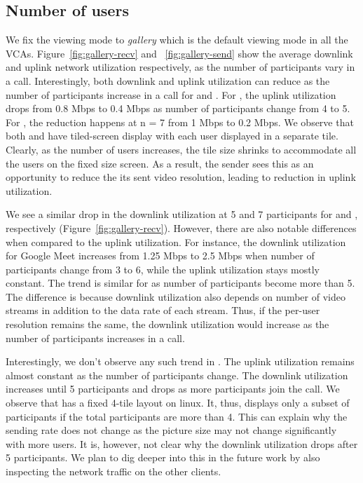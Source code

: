 \subsection{Number of users}
We fix the viewing mode to \textit{gallery} which is the default viewing mode in all the VCAs. Figure~\ref{fig:gallery-recv} and~
\ref{fig:gallery-send} show the average downlink and uplink network utilization respectively, as the number of participants vary in a call. Interestingly, both downlink and uplink utilization can reduce as the number of participants increase in a call for \meet and \zoom. For \zoom, the uplink utilization drops from 0.8 Mbps to 0.4 Mbps as number of participants change from 4 to 5. For \meet, the reduction happens at n = 7 from 1 Mbps to  0.2 Mbps. We observe that both \meet and \zoom have tiled-screen display with each user displayed in a separate tile. Clearly, as the number of users increases, the tile size shrinks to accommodate all the users on the fixed size screen. As a result, the sender sees this as an opportunity to reduce the its sent video resolution, leading to reduction in uplink utilization.


We see a similar drop in the downlink utilization at 5 and 7 participants for \zoom and \meet, respectively (Figure~\ref{fig:gallery-recv}). However, there are also notable differences when compared to the uplink utilization. For instance, the downlink utilization for Google Meet increases from 1.25 Mbps to 2.5 Mbps when number of participants change from 3 to 6, while the uplink utilization stays mostly constant. The trend is similar for \zoom as number of participants become more than 5. The difference is because downlink utilization also depends on number of video streams in addition to the data rate of each stream. Thus, if the per-user resolution remains the same, the downlink utilization would increase as the number of participants increases in a call. 

Interestingly, we don't observe any such trend in \teams. The uplink utilization remains almost constant as the number of participants change. The downlink utilization increases until 5 participants and drops as more participants join the call. We observe that \teams has a fixed 4-tile layout on linux. It, thus, displays only a subset of participants if the total participants are more than 4. This can explain why the sending rate does not change as the picture size may not change significantly with more users. It is, however, not clear why the downlink utilization drops after 5 participants. We plan to dig deeper into this in the future work by also inspecting the network traffic on the other clients. 
 



